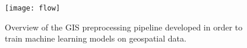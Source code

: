 \begin{figure}[H]
  \centering
  \texttt{[image: flow]}
  \caption{
    Overview of the GIS preprocessing pipeline developed in order to train machine learning models on geospatial data.
  }%
  \label{fig:preprocessing-overview}
\end{figure}
